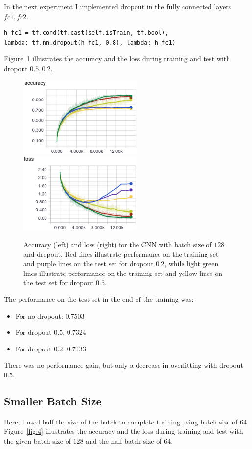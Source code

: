 \documentclass{article}
\begin{document}
In the next experiment I implemented dropout in the fully connected layers $fc1, fc2$.
\begin{verbatim}
h_fc1 = tf.cond(tf.cast(self.isTrain, tf.bool), 
lambda: tf.nn.dropout(h_fc1, 0.8), lambda: h_fc1)
\end{verbatim}
Figure~\ref{fig:3} illustrates the accuracy and the loss during training and test with dropout $0.5, 0.2$.
\begin{figure}[h!]
\centering
\includegraphics[height=4.0cm]{acc-plain-drop.png}\
\includegraphics[height=4.0cm]{loss-plain-drop.png}
\caption{Accuracy (left) and loss (right) for the CNN with batch size of $128$ and dropout. Red lines illustrate performance on the training set and purple lines on the test set for dropout $0.2$, while light green lines illustrate performance on the training set and yellow lines on the test set for dropout $0.5$.}
\label{fig:3}
\end{figure}
The performance on the test set in the end of the training was:
\begin{itemize}
\item For no dropout: $\mathbf{0.7503}$
\item For dropout $0.5$: $0.7324$
\item For dropout $0.2$: $0.7433$
\end{itemize}
There was no performance gain, but only a decrease in overfitting with dropout $0.5$.


\subsection{Smaller Batch Size}

Here, I used half the size of the batch to complete training using batch size of $64$.
Figure~\ref{fig:4} illustrates the accuracy and the loss during training and test with the given batch size of $128$ and the half batch size of $64$.
\end{document}
